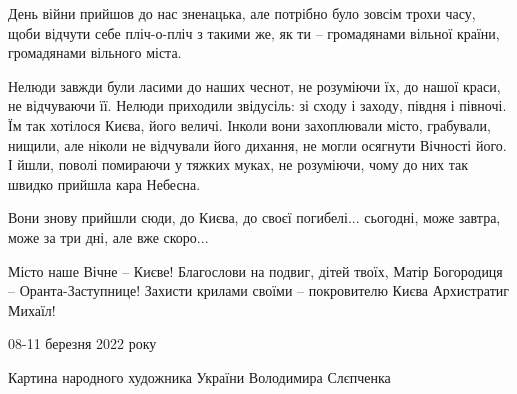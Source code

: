 День війни прийшов до нас зненацька, але потрібно було зовсім трохи часу, щоби
відчути себе пліч-о-пліч з такими же, як ти  -- громадянами вільної країни,
громадянами вільного міста.

Нелюди завжди були ласими до наших чеснот, не розуміючи їх, до нашої краси, не
відчуваючи її. Нелюди приходили звідусіль: зі сходу і заходу, півдня і півночі.
Їм так хотілося Києва, його величі. Інколи вони захоплювали місто, грабували,
нищили, але ніколи не відчували його дихання, не могли осягнути Вічності його.
І йшли, поволі помираючи у тяжких муках, не розуміючи, чому до них так швидко
прийшла кара Небесна.

Вони знову прийшли сюди, до Києва, до своєї погибелі... сьогодні, може завтра,
може за три дні, але вже скоро...

Місто наше Вічне -- Києве! Благослови на подвиг, дітей твоїх, Матір Богородиця
-- Оранта-Заступнице! Захисти крилами своїми -- покровителю Києва Архистратиг
Михаїл!

08-11 березня 2022 року

Картина народного художника України Володимира Слєпченка


